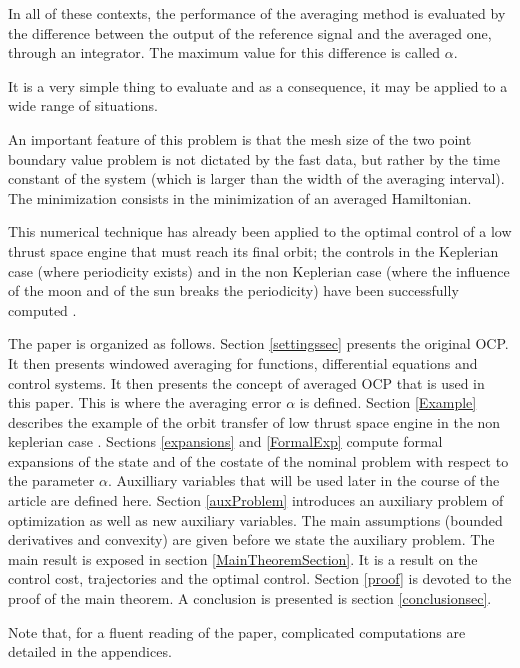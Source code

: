 \documentclass[a4paper,10pt]{article}
\begin{document}
In all of these contexts, the performance of the averaging method is 
evaluated by the difference between the output of the reference 
signal and the averaged one, through an integrator. The maximum value 
for this difference is called $\alpha$.


It is a very simple thing to evaluate and as a consequence, it may be 
applied to a wide range of situations.

An important feature of this problem is that the mesh size of the two 
point boundary value problem is not dictated by the fast data, but 
rather by the time constant of the system (which is larger than the 
width of the averaging interval). The minimization consists in 
the minimization of an averaged Hamiltonian.

This numerical technique has already been applied to the optimal 
control of a low thrust space engine that must reach its final orbit; 
the controls in the Keplerian case (where periodicity exists) and in the non Keplerian 
case (where the influence of the moon and of the sun breaks the 
periodicity) have been successfully computed \cite{goumri}.





 The paper is organized as follows.
 Section \ref{settingssec} presents 
the original  OCP. It then presents windowed averaging for functions, 
differential equations and control systems. It then presents the 
concept of 
averaged OCP that is used in this 
paper. This is where the averaging error $\alpha$ is defined. Section \ref{Example} 
describes the example of the orbit 
transfer of low thrust space engine in the non keplerian case 
\cite{goumri}. Sections \ref{expansions} 
and \ref{FormalExp} compute formal expansions of the state and of the costate of 
the nominal problem with respect to the parameter $\alpha$. 
Auxilliary variables that will be used later in the course of the 
article are defined here. Section \ref{auxProblem} introduces an auxiliary problem of optimization as 
well as new auxiliary variables. The main assumptions (bounded 
derivatives and convexity) are given before we state the auxiliary 
problem.
The main result is exposed in section \ref{MainTheoremSection}. It is 
a
result on the control cost, trajectories and the optimal control.
 Section \ref{proof} is devoted to the proof of the main theorem.
 A conclusion is presented is section \ref{conclusionsec}. 
 
 Note that, for a fluent reading of the paper, 
 complicated computations are detailed in the appendices.
  
\end{document}
